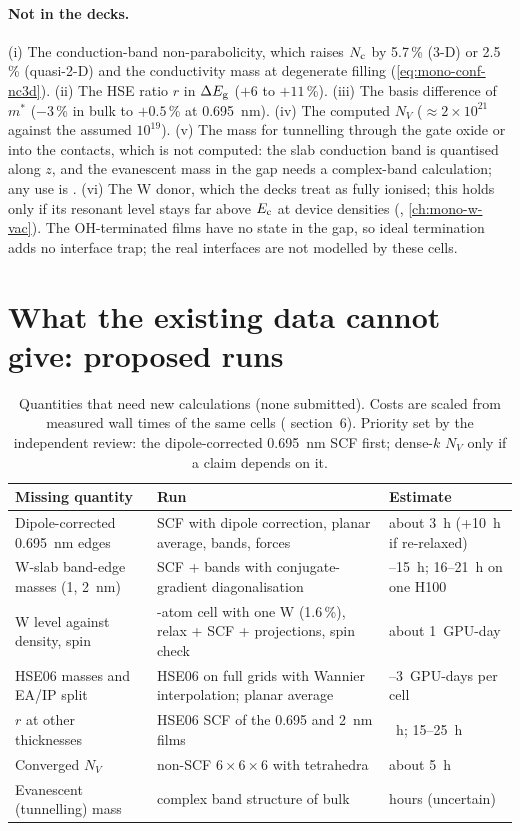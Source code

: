 \paragraph{Not in the decks.} (i) The conduction-band non-parabolicity, which raises $N_{\mathrm{c}}$ by 5.7\,\% (3-D) or 2.5\,\%
(quasi-2-D) and the conductivity mass at degenerate filling (\cref{eq:mono-conf-nc3d}). (ii) The HSE ratio $r$ in
$\Delta E_{\mathrm{g}}$ ($+6$ to $+11$\,\%). (iii) The basis difference of $m^*$ ($-3$\,\% in bulk to $+0.5$\,\% at 0.695~nm).
(iv) The computed $N_V$ ($\approx2\times10^{21}$ against the assumed $10^{19}$\cmcu). (v) The mass for tunnelling through
the gate oxide or into the contacts, which is not computed: the slab conduction band is quantised along $z$, and the
evanescent mass in the gap needs a complex-band calculation; any use is . (vi) The W donor, which the decks
treat as fully ionised; this holds only if its resonant level stays far above $E_{\mathrm{c}}$ at device densities
(, \cref{ch:mono-w-vac}). The OH-terminated films have no state in the gap, so ideal termination adds no
interface trap; the real interfaces are not modelled by these cells.

\section{What the existing data cannot give: proposed runs}
\label{sec:mono-mass-runs}

\begin{table}[htbp]\centering\footnotesize
\caption{Quantities that need new calculations (none submitted). Costs are scaled from measured wall times of the same
cells ( section~6). Priority set by the independent review: the dipole-corrected 0.695~nm SCF first;
dense-$k$ $N_V$ only if a claim depends on it.}
\label{tab:mono-mass-runs}
\begin{tabularx}{\linewidth}{@{}>{\raggedright\arraybackslash}p{4.6cm}>{\raggedright\arraybackslash}X>{\raggedright\arraybackslash}p{3.3cm}@{}}
\toprule
Missing quantity & Run & Estimate \\\midrule
Dipole-corrected 0.695~nm edges & SCF with dipole correction, planar average, bands, forces & about 3~h (+10~h if re-relaxed) \\
W-slab band-edge masses (1, 2~nm) & SCF + bands with conjugate-gradient diagonalisation & 12--15~h; 16--21~h on one H100 \\
W level against density, spin & 160-atom cell with one W (1.6\,\%), relax + SCF + projections, spin check & about 1~GPU-day \\
HSE06 masses and EA/IP split & HSE06 on full grids with Wannier interpolation; planar average & 1--3~GPU-days per cell \\
$r$ at other thicknesses & HSE06 SCF of the 0.695 and 2~nm films & 3~h; 15--25~h \\
Converged $N_V$ & non-SCF $6\times6\times6$ with tetrahedra & about 5~h \\
Evanescent (tunnelling) mass & complex band structure of bulk \InO{} & hours (uncertain) \\\bottomrule
\end{tabularx}
\end{table}

